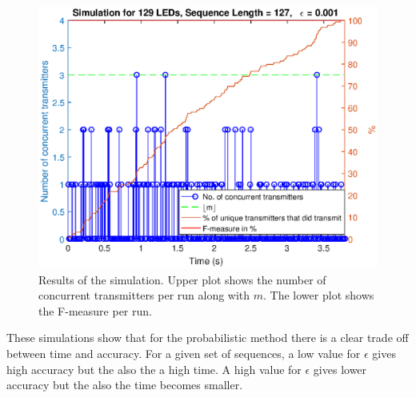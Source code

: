 \begin{figure}[tbp]
	\centering
	\includegraphics[width=\textwidth]{chapters/evaluation-chapters/simulation/sim-concurrent-tx-and-f-measure-eps=001-n=7.eps}
	\caption{Results of the simulation. Upper plot shows the number of concurrent transmitters per run along with $m$. The lower plot shows the F-measure per run.}
	\label{fig:sim-concurrent-tx-and-f-measure-eps=001-n=7}
\end{figure}

 

These simulations show that for the probabilistic method there is a clear trade off between time and accuracy.
For a given set of sequences, a low value for $\epsilon$ gives high accuracy but the also the a high time.
A high value for $\epsilon$ gives lower accuracy but the also the time becomes smaller.